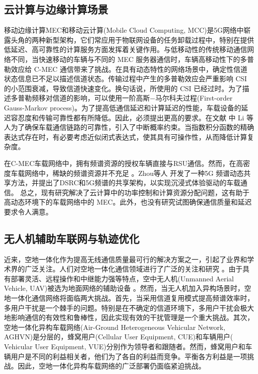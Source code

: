 \subsection{云计算与边缘计算场景}\label{section1-2-2}
移动边缘计算MEC和移动云计算(Mobile Cloud Computing, MCC)是5G网络中崭露头角的两种新型架构，它们常应用于物联网设备的任务卸载过程中，特别在提供低延迟、高可靠性的计算服务方面发挥着关键作用。与低移动性的传统移动通信网络不同，当快速移动的车辆与不同的 MEC 服务器通信时，车辆高移动性下的多普勒效应给 C-MEC 通信带来了挑战。在具有动态特性的网络场景中，确定性信道状态信息已不足以描述信道状态。传输过程中产生的多普勒效应会严重影响 CSI 的小范围衰减，导致信道快速变化。换句话说，所使用的 CSI 已经过时。为了描述多普勒频移对信道的影响，可以使用一阶高斯$-$马尔科夫过程(First-order Gauss-Markov process)\supercite{CCO}。为了提高低通信延迟和计算延迟的性能，车载设备的延迟容忍度和传输可靠性都有所降低。因此，必须提出更高的要求。在文献 \cite{Li2020} 中 Li 等人为了确保车载通信链路的可靠性，引入了中断概率约束。当指数积分函数的精确表达式存在时，有必要考虑近似闭式表达式，使其具有可操作性，从而降低计算复杂度。

在C-MEC车载网络中，拥有频谱资源的授权车辆直接与RSU通信。然而，在高密度车载网络中，稀缺的频谱资源并不充足 \supercite{Xie2020}。Zhou等人 \supercite{Zhou2017} 开发了一种5G 频谱动态共享方法，并提出了DSRC和5G频谱的共享架构，以实现沉浸式体验驱动的车载通信。
总之，现有研究解决了云计算中的功率控制和计算资源分配问题，这有助于高动态环境下的车载网络中的 MEC。此外，也没有研究试图确保通信质量和延迟要求令人满意。
\subsection{无人机辅助车联网与轨迹优化}\label{section1-2-3}
近来，空地一体化作为提高无线通信质量最可行的解决方案之一，引起了业界和学术界的广泛关注。人们对空地一体化通信领域进行了广泛的关注和研究 \supercite{OUC,SDR}。由于具有部署灵活、远程操作和中继能力强等特点，空中无人机(Unmanned Aerial Vehicle, UAV)被选为地面网络的辅助设备 \supercite{ACO}。然而，当无人机加入异构场景时，空地一体化通信网络将面临两大挑战。首先，当采用信道复用模式提高频谱效率时，多用户干扰是一个棘手的问题。特别是在不确定的信道环境下，多用户干扰会极大地影响通信的有效性和鲁棒性，因此实现有效的干扰管理是一个重大挑战。其次，空地一体化异构车载网络(Air-Ground Heterogeneous Vehicular Network, AGHVN)是分层的，蜂窝用户(Cellular User Equipment, CUE)和车辆用户( Vehicular User Equipment, VUE)分别作为领导者和跟随者。然而，蜂窝用户和车辆用户是不同的利益相关者，他们为了各自的利益而竞争。平衡各方利益是一项挑战。因此，空地一体化异构车载网络的广泛部署仍面临紧迫挑战。

